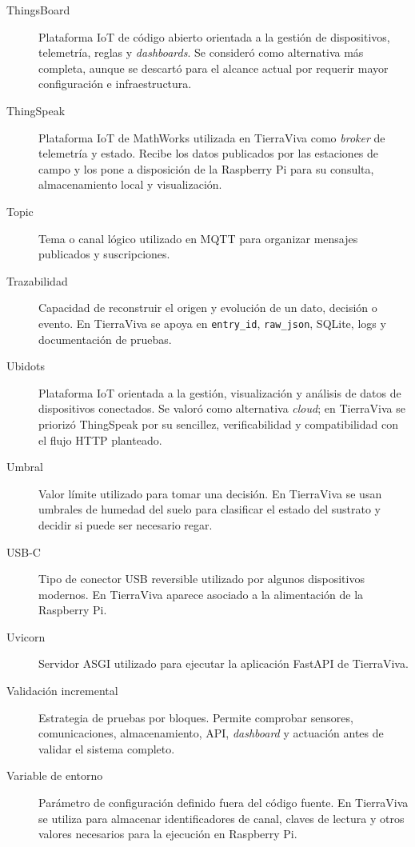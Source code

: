\begin{description}
    \item[ThingsBoard]
    Plataforma IoT de código abierto orientada a la gestión de dispositivos, telemetría, reglas y \textit{dashboards}. Se consideró como alternativa más completa, aunque se descartó para el alcance actual por requerir mayor configuración e infraestructura.

    \item[ThingSpeak]
    Plataforma IoT de MathWorks utilizada en TierraViva como \textit{broker} de telemetría y estado. Recibe los datos publicados por las estaciones de campo y los pone a disposición de la Raspberry Pi para su consulta, almacenamiento local y visualización.
    
    \item[Topic]
    Tema o canal lógico utilizado en MQTT para organizar mensajes publicados y suscripciones.

    \item[Trazabilidad]
    Capacidad de reconstruir el origen y evolución de un dato, decisión o evento. En TierraViva se apoya en \texttt{entry\_id}, \texttt{raw\_json}, SQLite, logs y documentación de pruebas.

    \item[Ubidots]
    Plataforma IoT orientada a la gestión, visualización y análisis de datos de dispositivos conectados. Se valoró como alternativa \textit{cloud}; en TierraViva se priorizó ThingSpeak por su sencillez, verificabilidad y compatibilidad con el flujo HTTP planteado.

    \item[Umbral]
    Valor límite utilizado para tomar una decisión. En TierraViva se usan umbrales de humedad del suelo para clasificar el estado del sustrato y decidir si puede ser necesario regar.

    \item[USB-C]
    Tipo de conector USB reversible utilizado por algunos dispositivos modernos. En TierraViva aparece asociado a la alimentación de la Raspberry Pi.

    \item[Uvicorn]
    Servidor ASGI utilizado para ejecutar la aplicación FastAPI de TierraViva.

    \item[Validación incremental]
    Estrategia de pruebas por bloques. Permite comprobar sensores, comunicaciones, almacenamiento, API, \textit{dashboard} y actuación antes de validar el sistema completo.

    \item[Variable de entorno]
    Parámetro de configuración definido fuera del código fuente. En TierraViva se utiliza para almacenar identificadores de canal, claves de lectura y otros valores necesarios para la ejecución en Raspberry Pi.

\end{description}

